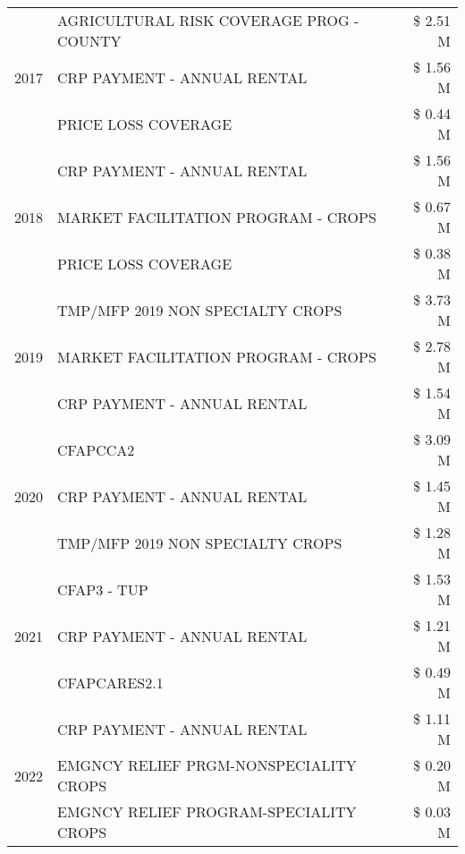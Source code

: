 \begin{tabular}{llr}
\cline{1-3}
\multirow[t]{3}{*}{2017} & AGRICULTURAL RISK COVERAGE PROG - COUNTY & \$ 2.51 M \\
 & CRP PAYMENT - ANNUAL RENTAL & \$ 1.56 M \\
 & PRICE LOSS COVERAGE & \$ 0.44 M \\
\cline{1-3}
\multirow[t]{3}{*}{2018} & CRP PAYMENT - ANNUAL RENTAL & \$ 1.56 M \\
 & MARKET FACILITATION PROGRAM - CROPS & \$ 0.67 M \\
 & PRICE LOSS COVERAGE & \$ 0.38 M \\
\cline{1-3}
\multirow[t]{3}{*}{2019} & TMP/MFP 2019 NON SPECIALTY CROPS & \$ 3.73 M \\
 & MARKET FACILITATION PROGRAM - CROPS & \$ 2.78 M \\
 & CRP PAYMENT - ANNUAL RENTAL & \$ 1.54 M \\
\cline{1-3}
\multirow[t]{3}{*}{2020} & CFAPCCA2 & \$ 3.09 M \\
 & CRP PAYMENT - ANNUAL RENTAL & \$ 1.45 M \\
 & TMP/MFP 2019 NON SPECIALTY CROPS & \$ 1.28 M \\
\cline{1-3}
\multirow[t]{3}{*}{2021} & CFAP3 - TUP & \$ 1.53 M \\
 & CRP PAYMENT - ANNUAL RENTAL & \$ 1.21 M \\
 & CFAPCARES2.1 & \$ 0.49 M \\
\cline{1-3}
\multirow[t]{3}{*}{2022} & CRP PAYMENT - ANNUAL RENTAL & \$ 1.11 M \\
 & EMGNCY RELIEF PRGM-NONSPECIALITY CROPS & \$ 0.20 M \\
 & EMGNCY RELIEF PROGRAM-SPECIALITY CROPS & \$ 0.03 M \\
\cline{1-3}
\bottomrule
\end{tabular}
